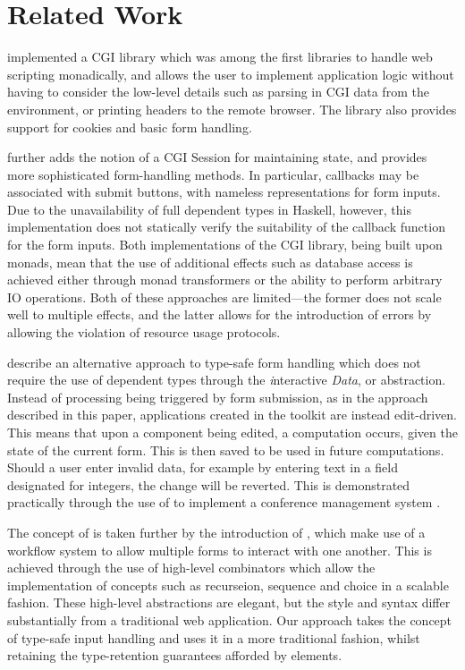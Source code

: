 \section{Related Work}
\citet{meijer:cgi} implemented a CGI library which was among the first
libraries to handle web scripting monadically, and allows the user to implement
application logic without having to consider the low-level details such as
parsing in CGI data from the environment, or printing headers to the remote
browser. The library also provides support for cookies and basic form handling. 

\citet{thiemann:wash} further adds the notion of a CGI Session for maintaining
state, and provides more sophisticated form-handling methods. In particular,
callbacks may be associated with submit buttons, with nameless representations
for form inputs. Due to the unavailability of full dependent types in Haskell,
however, this implementation does not statically verify the suitability of the
callback function for the form inputs. Both implementations of the CGI library,
being built upon monads, mean that the use of additional effects such as
database access is achieved either through monad transformers or the ability to
perform arbitrary IO operations. Both of these approaches are limited---the
former does not scale well to multiple effects, and the latter allows for the
introduction of errors by allowing the violation of resource usage protocols.

\citet{plasmeijer:idata} describe an alternative approach to type-safe form
handling which does not require the use of dependent types through the
\textit{i}nteractive \textit{Data}, or \idata{} abstraction. Instead of
processing being triggered by form submission, as in the approach described in
this paper, applications created in the \idata{} toolkit are instead
edit-driven. This means that upon a component being edited, a computation
occurs, given the state of the current form. This is then saved to be used in
future computations. Should a user enter invalid data, for example by entering
text in a field designated for integers, the change will be reverted. This is
demonstrated practically through the use of \idata{} to implement a conference
management system \cite{plasmeijer:cms}.

The concept of \idata{} is taken further by the introduction of \itasks{}
\cite{plasmeijer:itasks}, which make use of a workflow system to allow multiple
\idata{} forms to interact with one another. This is achieved through the use
of high-level combinators which allow the implementation of concepts such as
recurseion, sequence and choice in a scalable fashion. These high-level
abstractions are elegant, but the style and syntax differ substantially from a
traditional web application. Our approach takes the concept of type-safe input
handling and uses it in a more traditional fashion, whilst retaining the
type-retention guarantees afforded by \idata{} elements.

